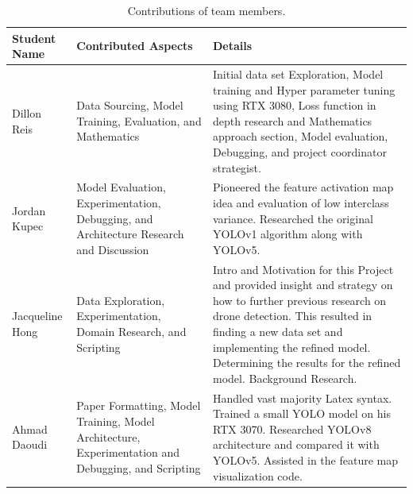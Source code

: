 \documentclass[10pt,twocolumn,letterpaper]{article}
\begin{document}
{\small


}
\begin{table}
\begin{center}			  
\begin{tabular}{|l|p{7cm}|p{8cm}|}
\hline
Student Name & Contributed Aspects & Details \\
\hline
Dillon Reis & Data Sourcing, Model Training, Evaluation, and Mathematics & Initial data set Exploration, Model training and Hyper parameter tuning using RTX 3080, Loss function in depth research and Mathematics approach section, Model evaluation, Debugging, and project coordinator strategist. \\
\hline
Jordan Kupec & Model Evaluation, Experimentation, Debugging, and Architecture Research and Discussion & Pioneered the feature activation map idea and evaluation of low interclass variance. Researched the original YOLOv1 algorithm along with YOLOv5. \\
\hline
Jacqueline Hong & Data Exploration, Experimentation, Domain Research, and Scripting & Intro and Motivation for this Project and provided insight and strategy on how to further previous research on drone detection. This resulted in finding a new data set and implementing the refined model. Determining the results for the refined model. Background Research. \\
\hline
Ahmad Daoudi & Paper Formatting, Model Training, Model Architecture, Experimentation and Debugging, and Scripting & Handled vast majority Latex syntax. Trained a small YOLO model on his RTX 3070. Researched YOLOv8 architecture and compared it with YOLOv5. Assisted in the feature map visualization code.\\
\hline
\end{tabular}
\end{center}
\caption{Contributions of team members.}
\label{tab:contributions}
\end{table}
\end{document}
